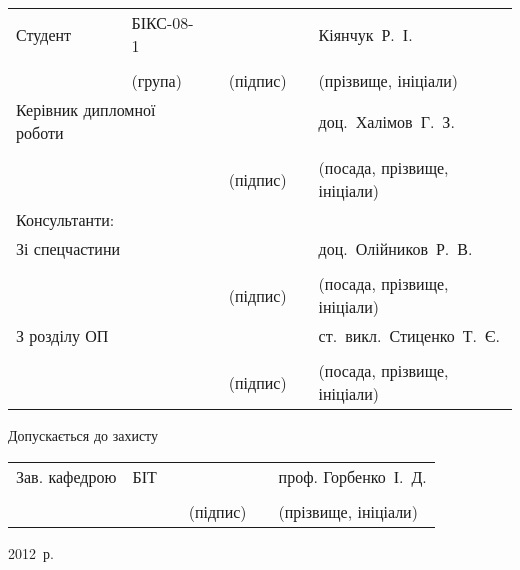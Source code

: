 \begin{titlepage}
\begin{center}
        \begin{tabular}{ 
            p{}
            >{\centering\arraybackslash}p{} 
            >{\centering\arraybackslash}p{} 
            >{\centering\arraybackslash}p{}
            >{\centering\arraybackslash}p{} 
            >{\centering\arraybackslash}p{}}
            Студент & БІКС-08-1 & & & & Кіянчук~Р.~І. \\ \cline{2-2}\cline{4-4}\cline{6-6} \\[-4ex]
            & {\scriptsize (група)} & & {\scriptsize (підпис)} & & {\scriptsize (прізвище, ініціали)} \\[1ex]
            \multicolumn{2}{p{0.4\textwidth}}{Керівник дипломної роботи} & & & & доц.~Халімов~Г.~З. \\ \cline{4-4}\cline{6-6} \\[-4ex]
            & & & {\scriptsize (підпис)} & & {\scriptsize (посада, прізвище, ініціали)} \\
            Консультанти: & & & & & \\[1ex]
            \multicolumn{2}{p{0.4\textwidth}}{Зі спецчастини} & & & & доц.~Олійников~Р.~В. \\ \cline{4-4}\cline{6-6} \\[-4ex]
            & & & {\scriptsize (підпис)} & & {\scriptsize (посада, прізвище, ініціали)} \\[1ex]
            \multicolumn{2}{p{0.4\textwidth}}{З розділу ОП} & & & & ст.~викл.~Стиценко~Т.~Є. \\ \cline{4-4}\cline{6-6} \\[-4ex]
            & & & {\scriptsize (підпис)} & & {\scriptsize (посада, прізвище, ініціали)} \\[1ex]
        \end{tabular}

        \vfill
        \begin{flushleft}
            \hspace{4ex}Допускається до захисту \\[1ex]
        \end{flushleft}
        \begin{tabular}{ 
            p{}
            >{\centering\arraybackslash}p{} 
            >{\centering\arraybackslash}p{} 
            >{\centering\arraybackslash}p{}
            >{\centering\arraybackslash}p{} 
            >{\centering\arraybackslash}p{}}
            Зав. кафедрою & БІТ & & & & проф. Горбенко~І.~Д. \\ \cline{2-2}\cline{4-4}\cline{6-6} \\[-4ex]
            & & & {\scriptsize (підпис)} & & {\scriptsize (прізвище, ініціали)} \\[1ex]
        \end{tabular}
        \vfill
        2012~р.
    \end{center}
\end{titlepage}
\newpage

\addtocounter{page}{1}
